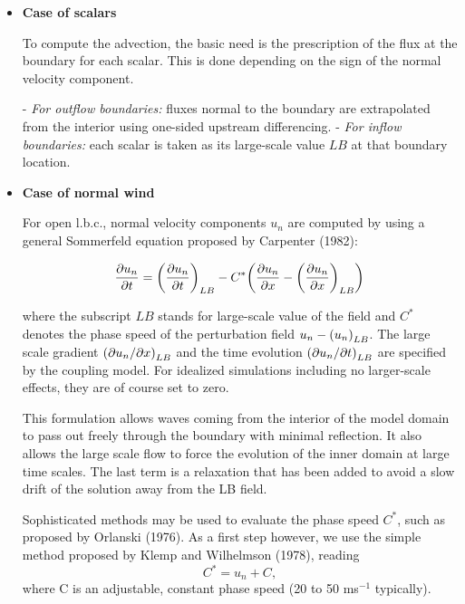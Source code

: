 \begin{itemize}
\item {\bf Case of scalars}

To compute the advection, the basic need is the prescription of the flux
at the boundary for each scalar. This is done depending
on the sign of the normal velocity component.

\subitem - {\it For outflow boundaries:} fluxes normal to the boundary are
extrapolated from the interior using one-sided upstream differencing.
\subitem - {\it For inflow boundaries:}  each scalar is taken as its
large-scale value $LB$ at that boundary location.

\item {\bf Case of normal wind}

For open l.b.c., normal velocity components $u_n$ are computed by using a
general Sommerfeld equation proposed by Carpenter (1982):


\begin{equation}
\label{carpenter}
{\partial u_n \over \partial t} =             {\left({{\partial u_n \over \partial t}}\right)}_{LB}
- C^*{\left(  {\partial u_n \over \partial x}  -  {\left({{\partial u_n \over \partial x}}\right)}_{LB}  \right)}
\end{equation}

\noindent
 where the subscript $LB$ stands for large-scale value of the field and
$C^*$ denotes the phase speed of the perturbation field
$u_n - {\left({u_n}\right)}_{LB}$.
The large scale gradient
${\left( {\partial u_n} / {\partial x} \right)}_{LB}$ and the time evolution
${\left( {\partial u_n} / {\partial t} \right)}_{LB}$ are specified by the coupling model.
For idealized simulations including no larger-scale effects, they are of
course set to zero.

This formulation allows waves coming from the interior of the model domain
to pass out freely through the boundary with minimal reflection. It also
allows the large scale flow to force the evolution of the inner domain at
large time scales. The last term is a relaxation that has been added to
avoid a slow drift of the solution away from the LB field.

Sophisticated methods may be used to evaluate the phase speed $C^*$,
such as proposed by Orlanski (1976). As a first step however,
we use the simple method proposed by Klemp and Wilhelmson (1978), reading
\begin{equation}
C^*= u_n + C,
\end{equation}
\noindent
where C is an adjustable, constant phase speed (20 to 50 ms$^{-1}$ typically).



\end{itemize}
